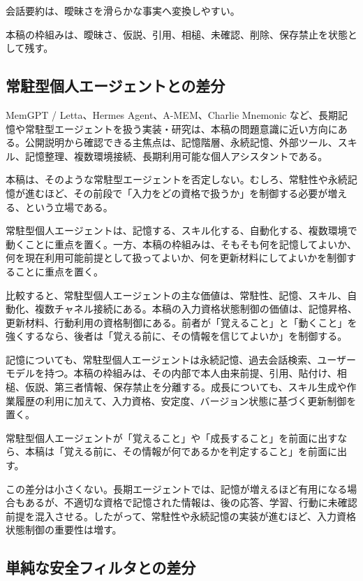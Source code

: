 \documentclass[12pt,a4paper]{article}
\begin{document}
会話要約は、曖昧さを滑らかな事実へ変換しやすい。

本稿の枠組みは、曖昧さ、仮説、引用、相槌、未確認、削除、保存禁止を状態として残す。

\subsection{常駐型個人エージェントとの差分}\label{ux5e38ux99d0ux578bux500bux4ebaux30a8ux30fcux30b8ux30a7ux30f3ux30c8ux3068ux306eux5deeux5206}

MemGPT / Letta、Hermes Agent、A-MEM、Charlie Mnemonic など、長期記憶や常駐型エージェントを扱う実装・研究は、本稿の問題意識に近い方向にある。公開説明から確認できる主焦点は、記憶階層、永続記憶、外部ツール、スキル、記憶整理、複数環境接続、長期利用可能な個人アシスタントである。

本稿は、そのような常駐型エージェントを否定しない。むしろ、常駐性や永続記憶が進むほど、その前段で「入力をどの資格で扱うか」を制御する必要が増える、という立場である。

常駐型個人エージェントは、記憶する、スキル化する、自動化する、複数環境で動くことに重点を置く。一方、本稿の枠組みは、そもそも何を記憶してよいか、何を現在利用可能前提として扱ってよいか、何を更新材料にしてよいかを制御することに重点を置く。

比較すると、常駐型個人エージェントの主な価値は、常駐性、記憶、スキル、自動化、複数チャネル接続にある。本稿の入力資格状態制御の価値は、記憶昇格、更新材料、行動利用の資格制御にある。前者が「覚えること」と「動くこと」を強くするなら、後者は「覚える前に、その情報を信じてよいか」を制御する。

記憶についても、常駐型個人エージェントは永続記憶、過去会話検索、ユーザーモデルを持つ。本稿の枠組みは、その内部で本人由来前提、引用、貼付け、相槌、仮説、第三者情報、保存禁止を分離する。成長についても、スキル生成や作業履歴の利用に加えて、入力資格、安定度、バージョン状態に基づく更新制御を置く。

常駐型個人エージェントが「覚えること」や「成長すること」を前面に出すなら、本稿は「覚える前に、その情報が何であるかを判定すること」を前面に出す。

この差分は小さくない。長期エージェントでは、記憶が増えるほど有用になる場合もあるが、不適切な資格で記憶された情報は、後の応答、学習、行動に未確認前提を混入させる。したがって、常駐性や永続記憶の実装が進むほど、入力資格状態制御の重要性は増す。

\subsection{単純な安全フィルタとの差分}\label{ux5358ux7d14ux306aux5b89ux5168ux30d5ux30a3ux30ebux30bfux3068ux306eux5deeux5206}
\end{document}
